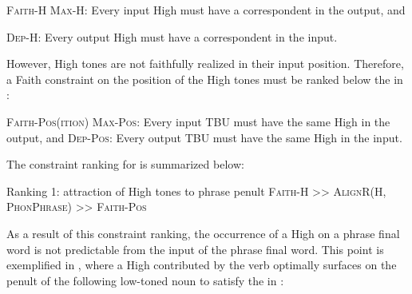 \documentclass[output=paper
,newtxmath
,modfonts
,nonflat]{../langsci/langscibook}
\begin{document}
\ea\label{ex:downing:15}\textsc{Faith-H}
\ea\label{ex:downing:15a} \textsc{Max-H}: Every input High  must have a correspondent in the output, and

\ex\label{ex:downing:15b}\textsc{Dep-H}: Every output High  must have a correspondent in the input.
\z
\z

However, High tones are not faithfully realized in their input position. Therefore, a Faith constraint on the position of the High tones must be ranked below the  in :

\ea\label{ex:downing:16}  \textsc{Faith-Pos(ition)}
\sn
\ea\label{ex:downing:16a} \textsc{Max-Pos}: Every input TBU must have the same High  in the output, and
\ex\label{ex:downing:16a}\textsc{Dep-Pos}: Every output TBU must have the same High  in the input.
\z
\z

The constraint ranking for  is summarized below:


\ea\label{ex:downing:17}  Ranking 1:  attraction of High tones to phrase penult
\sn
\textsc{Faith-H >> AlignR(H, PhonPhrase}) \textsc{>> Faith-Pos}
\z


As a result of this constraint ranking, the occurrence of a High  on a phrase final word is not predictable from the input  of the phrase final word. This point is exemplified in , where a High  contributed by the verb optimally surfaces on the penult of the following low-toned noun to satisfy the  in :

\end{document}
